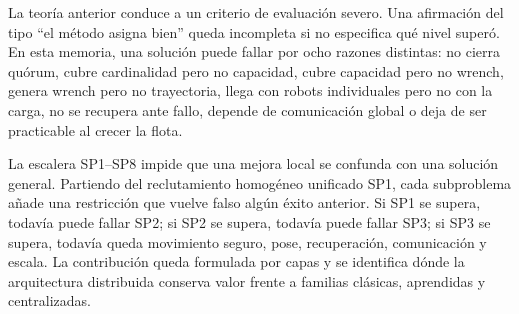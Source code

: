 La teoría anterior conduce a un criterio de evaluación severo. Una afirmación del tipo
``el método asigna bien'' queda incompleta si no especifica qué nivel superó. En esta
memoria, una solución puede fallar por ocho razones distintas: no cierra quórum, cubre
cardinalidad pero no capacidad, cubre capacidad pero no wrench, genera wrench pero no
trayectoria, llega con robots individuales pero no con la carga, no se recupera ante
fallo, depende de comunicación global o deja de ser practicable al crecer la flota.

La escalera SP1--SP8 impide que una mejora local se confunda con una solución general.
Partiendo del reclutamiento homogéneo unificado SP1, cada subproblema añade una restricción que
vuelve falso algún éxito anterior. Si SP1 se supera, todavía puede fallar SP2; si SP2 se
supera, todavía puede fallar SP3; si SP3 se supera, todavía queda movimiento seguro,
pose, recuperación, comunicación y escala. La contribución queda formulada por capas y
se identifica dónde la arquitectura distribuida conserva valor frente a familias
clásicas, aprendidas y centralizadas.
